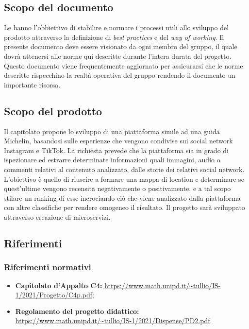 \subsection{Scopo del documento}
Le \NdP{} hanno l'obbiettivo di stabilire e normare i processi utili allo sviluppo del prodotto attraverso la definizione di \emph{best practices} e del \emph{way of working}.
Il presente documento deve essere visionato da ogni membro del gruppo, il quale dovrà attenersi alle norme qui descritte durante l'intera durata del progetto.
Questo documento viene frequentemente aggiornato per assicurarsi che le norme descritte rispecchino la realtà operativa del gruppo rendendo il documento un importante risorsa.
\subsection{Scopo del prodotto}
Il capitolato propone lo sviluppo di una piattaforma simile ad una guida Michelin, basandosi sulle esperienze che vengono condivise sui social network Instagram e TikTok.
La richiesta prevede che la piattaforma sia in grado di ispezionare ed estrarre determinate informazioni quali immagini, audio o commenti relativi al contenuto analizzato, dalle storie dei relativi social network.
L'obiettivo è quello di riuscire a formare una mappa di location e determinare se quest'ultime vengono recensita negativamente o positivamente, e a tal scopo stilare un ranking di esse incrociando ciò che viene analizzato dalla piattaforma con altre classifiche per rendere omogeneo il risultato.
Il progetto sarà sviluppato attraverso creazione di microservizi.
\subsection{Riferimenti} %
\subsubsection{Riferimenti normativi}
\begin{itemize}
	\item \textbf{Capitolato d'Appalto C4:} \url{https://www.math.unipd.it/~tullio/IS-1/2021/Progetto/C4p.pdf};
	\item \textbf{Regolamento del progetto didattico:} \url{https://www.math.unipd.it/~tullio/IS-1/2021/Dispense/PD2.pdf}.
\end{itemize}
